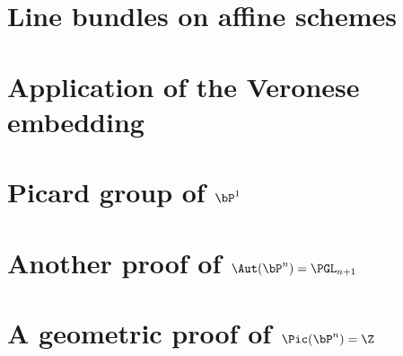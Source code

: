 \documentclass{../util/zariski-small}
\begin{document}
\section{Line bundles on affine schemes}


\section{Application of the Veronese embedding}


\section[Picard group of projective space]{Picard group of $\bP^1$}


\section[Automorphism group of projective space]{Another proof of $\Aut(\bP^n) = \PGL_{n+1}$}


\section[Picard group of projective space (geometric)]{A geometric proof of $\Pic(\bP^n)=\Z$}
\label{geometric-proof}


\newpage



\printindex

\printbibliography
\end{document}
